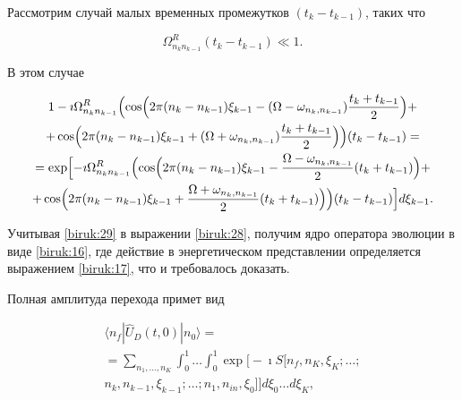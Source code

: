 Рассмотрим случай малых временных промежутков $(t_{k}-t_{k-1})$, таких что 

$$\Omega_{n_k n_{k-1}}^R (t_{k}-t_{k-1}) \ll 1.$$ 

В этом случае

\begin{multline}

\label{biruk:29}

1-\imath \Omega_{n_k n_{k-1}}^R

\Bigl(\cos\Bigl(2\pi (n_k-n_{k-1})\xi_{k-1}-(\Omega-\omega_{n_k,n_{k-1}})\frac{t_{k}+t_{k-1}}{2}\Bigr)

+

\\

+

\cos\Bigl(2\pi (n_k-n_{k-1})\xi_{k-1}+(\Omega+\omega_{n_k,n_{k-1}})\frac{t_{k}+t_{k-1}}{2}\Bigr)\Bigr)(t_{k}-t_{k-1})

=

\\

=

\exp\Bigl[-\imath \Omega_{n_k n_{k-1}}^R

\Bigl(\cos\Bigl(2\pi (n_k-n_{k-1})\xi_{k-1}-\frac{\Omega-\omega_{n_k,n_{k-1}}}{2}(t_{k}+t_{k-1})\Bigr)

+

\\

+

\cos\Bigl(2\pi (n_k-n_{k-1})\xi_{k-1}+\frac{\Omega+\omega_{n_k,n_{k-1}}}{2}(t_{k}+t_{k-1})\Bigr)\Bigr)(t_{k}-t_{k-1})\Bigr]d\xi_{k-1}. 

\end{multline}

Учитывая \eqref{biruk:29} в выражении \eqref{biruk:28}, получим ядро оператора эволюции в виде \eqref{biruk:16}, где действие в энергетическом представлении определяется выражением \eqref{biruk:17}, что и требовалось доказать.





\smallskip





Полная амплитуда перехода примет вид

\begin{multline}

\label{biruk:30}

\langle n_f| \hat{U}_D(t, 0)| n_{0}\rangle

=

\\

=

 \sum\limits_{n_{1},\dots,n_{K}} \int _{0}^{1} \dots \int _{0}^{1} \exp\bigl[-\imath S[n_f,n_{K},\xi_K;\dots;\\

 n_k,n_{k-1},\xi_{k-1};\dots;  n_{1},n_{in},\xi_0]\bigr]d\xi_0\dots d\xi_K ,

\end{multline}

